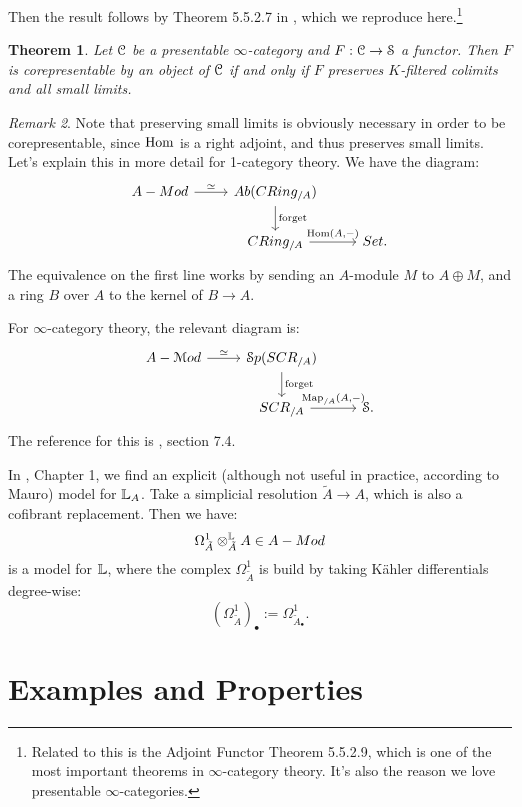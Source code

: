 \documentclass[10pt,a4paper,reqno,oneside]{book} %
\theoremstyle{plain}
\newtheorem{thm}{Theorem}[section]
\theoremstyle{definition}
\theoremstyle{remark}
\newtheorem{rem}[thm]{Remark}
\numberwithin{equation}{section}
\begin{document}
Then the result follows by Theorem 5.5.2.7 in \cite{HTT}, which we reproduce here.\footnote{Related to this is the Adjoint
Functor Theorem 5.5.2.9, which is one of the most important theorems in $\infty$-category theory. It's also the reason
we love presentable $\infty$-categories.}

\begin{thm}
Let $\mathcal C$ be a presentable $\infty$-category and $F : \mathcal C \to \mathcal S$ a functor. Then $F$ is corepresentable by an object of
$\mathcal C$ if and only if $F$ preserves $K$-filtered colimits and all small limits.
\end{thm}

\begin{rem}
Note that preserving small limits is obviously necessary in order to be corepresentable, since $\operatorname{Hom}$ is a right adjoint,
and thus preserves small limits. Let's explain this in more detail
for 1-category theory. We have the diagram:
\[
\begin{tikzcd}
A-Mod \arrow{r}{\simeq} & Ab(CRing_{/A})\arrow{d}{\text{forget}} & \\
 & CRing_{/A} \arrow{r}{\Hom(A, -)} & Set .
\end{tikzcd}
\]
The equivalence on the first line works by sending an $A$-module $M$ to $A \oplus M$, and a ring $B$ over $A$ to the kernel
of $B \to A$. 

For $\infty$-category theory, the relevant diagram is:
\[
\begin{tikzcd}
A-\cM od \arrow{r}{\simeq} & \cS p(SCR_{/A})\arrow{d}{\text{forget}} & \\
 & SCR_{/A} \arrow{r}{\Map_{/A}(A, -)} & \cS .
\end{tikzcd}
\]
The reference for this is \cite{Lurie_Higher_algebra}, section 7.4.
\end{rem}


In \cite{HAG-II}, Chapter 1, we find an explicit (although not useful in practice, according to Mauro) model 
for $\mathbb L_A$. Take a simplicial resolution $\tilde A \to A$, which is also a cofibrant replacement. Then we have:
\[	 \Omega_{\tilde A}^1 \otimes^{\mathbb L}_{\tilde A} A \in A-Mod	\]
is a model for $\mathbb L$, where the complex $\Omega_{\tilde A}^1$ is build by taking K\"ahler differentials degree-wise:
\[	(\Omega_{\tilde A}^1)_{\bullet} := \Omega^1_{\tilde A_{\bullet}}.	\]





\section{Examples and Properties}
\label{sect:cc_eg}
\end{document}
